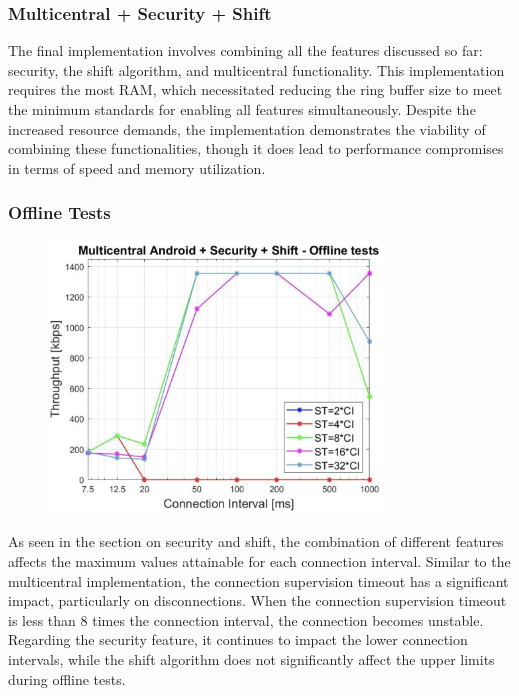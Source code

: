 \documentclass{Configuration_Files/PoliMi3i_thesis}
\begin{document}
\subsubsection*{Multicentral + Security + Shift}

The final implementation involves combining all the features discussed so far: security, the shift algorithm, and multicentral functionality. This implementation requires the most RAM, which necessitated reducing the ring buffer size to meet the minimum standards for enabling all features simultaneously. Despite the increased resource demands, the implementation demonstrates the viability of combining these functionalities, though it does lead to performance compromises in terms of speed and memory utilization.


\subsubsection*{Offline Tests}

\begin{figure}[h!]
    \centering
    \includegraphics[width=0.8\textwidth]{Results Manuel/figure30}
    \label{fig:figure1}
\end{figure}

As seen in the section on security and shift, the combination of different features affects the maximum values attainable for each connection interval. Similar to the multicentral implementation, the connection supervision timeout has a significant impact, particularly on disconnections. When the connection supervision timeout is less than 8 times the connection interval, the connection becomes unstable. Regarding the security feature, it continues to impact the lower connection intervals, while the shift algorithm does not significantly affect the upper limits during offline tests.
\end{document}
